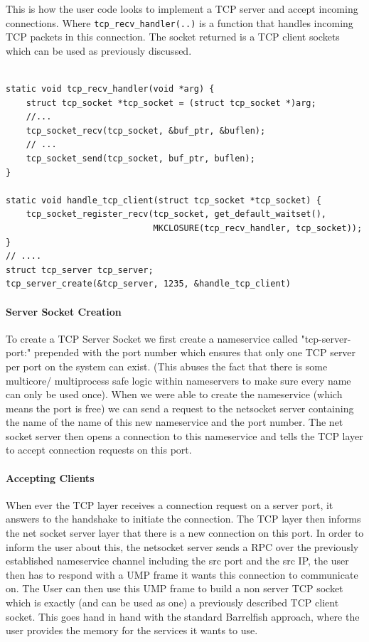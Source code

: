 This is how the user code looks to implement a TCP server and accept incoming connections. Where \texttt{tcp_recv_handler(..)}  is a function that handles incoming TCP packets in this connection. The socket returned is a TCP client sockets which can be used as previously discussed.
\begin{verbatim}

static void tcp_recv_handler(void *arg) {
    struct tcp_socket *tcp_socket = (struct tcp_socket *)arg;
    //...
    tcp_socket_recv(tcp_socket, &buf_ptr, &buflen);
    // ...
    tcp_socket_send(tcp_socket, buf_ptr, buflen);
}

static void handle_tcp_client(struct tcp_socket *tcp_socket) {
    tcp_socket_register_recv(tcp_socket, get_default_waitset(),
                             MKCLOSURE(tcp_recv_handler, tcp_socket));
}
// ....
struct tcp_server tcp_server;
tcp_server_create(&tcp_server, 1235, &handle_tcp_client)
\end{verbatim}

\paragraph{Server Socket Creation}
To create a TCP Server Socket we first create a nameservice called "tcp-server-port:" prepended with the port number which ensures that only one TCP server per port on the system can exist. (This abuses the fact that there is some multicore/ multiprocess safe logic within nameservers to make sure every name can only be used once). When we were able to create the nameservice (which means the port is free) we can send a request to the netsocket server containing the name of the name of this new nameservice and the port number. The net socket server then opens a connection to this nameservice and tells the TCP layer to accept connection requests on this port. 


\paragraph{Accepting Clients}

When ever the TCP layer receives a connection request on a server port, it answers to the handshake to initiate the connection. The TCP layer then informs the net socket server layer that there is a new connection on this port. In order to inform the user about this, the netsocket server sends a RPC over the previously established nameservice channel including the src port and the src IP, the user then has to respond with a UMP frame it wants this connection to communicate on. The User can then use this UMP frame to build a non server TCP socket which is exactly (and can be used as one) a previously described TCP client socket.
This goes hand in hand with the standard Barrelfish approach, where the user provides the memory for the services it wants to use. 


